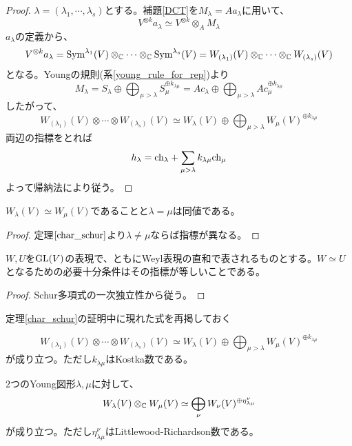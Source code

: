 \documentclass{ltjsreport}
\begin{document}
\begin{proof}
  $\lambda=(\lambda_1,\cdots,\lambda_s)$とする。補題\ref{DCT}を$M_\lambda=Aa_\lambda$に用いて、
  \[
  V^{\otimes k}a_\lambda\simeq V^{\otimes k}\otimes_AM_\lambda  
  \]
  $a_\lambda$の定義から、
  \[
  V^{\otimes k}a_\lambda
  =\text{Sym}^{\lambda_1}(V)\otimes_{\mathbb{C}}\cdots\otimes_{\mathbb{C}}\text{Sym}^{\lambda_s}(V)
  =W_{(\lambda_1)}(V)\otimes_{\mathbb{C}}\cdots\otimes_{\mathbb{C}} W_{(\lambda_s)}(V)
  \]
  となる。Youngの規則(系\ref{young_rule_for_rep})より
  \[
  M_\lambda
  =S_\lambda\oplus\bigoplus_{\mu>\lambda}S_\mu^{\oplus k_{\lambda\mu}}
  =Ac_\lambda\oplus\bigoplus_{\mu>\lambda}Ac_\mu^{\oplus k_{\lambda\mu}}
  \]
  したがって、
  \[
  W_{(\lambda_1)}(V)\otimes\cdots\otimes W_{(\lambda_s)}(V)
  \simeq 
  W_\lambda(V)\oplus\bigoplus_{\mu>\lambda}W_{\mu}(V)^{\oplus k_{\lambda\mu}}
  \]
  両辺の指標をとれば
  \[
  h_\lambda=\text{ch}_\lambda+\sum_{\mu>\lambda}k_{\lambda\mu}\text{ch}_\mu  
  \]
  よって帰納法により従う。
\end{proof}

\begin{cor}
  $W_\lambda(V)\simeq W_\mu(V)$であることと$\lambda=\mu$は同値である。
\end{cor}

\begin{proof}
  定理$\ref{char_schur}$より$\lambda\neq\mu$ならば指標が異なる。
\end{proof}

\begin{cor}
  $W,U$を$\text{GL}(V)$の表現で、ともにWeyl表現の直和で表されるものとする。$W\simeq U$となるための必要十分条件はその指標が等しいことである。
\end{cor}

\begin{proof}
  Schur多項式の一次独立性から従う。
\end{proof}

定理\ref{char_schur}の証明中に現れた式を再掲しておく

\begin{cor}[Youngの規則]
  \[
  W_{(\lambda_1)}(V)\otimes\cdots\otimes W_{(\lambda_s)}(V)
  \simeq 
  W_\lambda(V)\oplus\bigoplus_{\mu>\lambda}W_{\mu}(V)^{\oplus k_{\lambda\mu}}
  \]
  が成り立つ。ただし$k_{\lambda\mu}$はKostka数である。
\end{cor}

\begin{cor}
  $2$つのYoung図形$\lambda,\mu$に対して、
  \[
  W_\lambda(V)\otimes_{\mathbb{C}}W_\mu(V)\simeq \bigoplus_\nu W_\nu(V)^{\oplus \eta^{\nu}_{\lambda\mu}}
  \]
  が成り立つ。ただし$\eta^{\nu}_{\lambda\mu}$はLittlewood-Richardson数である。
\end{cor}
\end{document}
